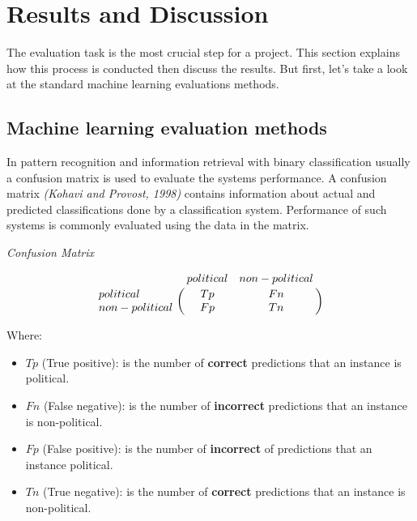
\chapter{Results and Discussion} %

\label{Chapter5} %



The evaluation task is the most crucial step for a project. This section explains how this process is conducted then discuss the results. But first, let's take a look at the standard machine learning evaluations methods. 

\section{Machine learning evaluation methods}
In pattern recognition and information retrieval with binary classification usually a confusion matrix is used to evaluate the systems performance.
A confusion matrix \textit{(Kohavi and Provost, 1998)} contains information about actual and predicted classifications done by a classification system. Performance of such systems is commonly evaluated using the data in the matrix.
\begin{theorem}
\label{confusion matrix}
\emph{Confusion Matrix}

$$\bordermatrix{~ & political & non-political \cr
                  political & Tp & Fn \cr
                  non-political & Fp & Tn \cr}$$
\end{theorem}
Where:
\begin{itemize}
\item $Tp$ (True positive): is the number of \textbf{correct} predictions that an instance is political.
\item $Fn$  (False negative): is the number of \textbf{incorrect} predictions that an instance is non-political.
\item $Fp$ (False positive): is the number of \textbf{incorrect} of predictions that an instance political.
\item $Tn$ (True negative): is the number of \textbf{correct} predictions that an instance is non-political.
\end{itemize}                  


